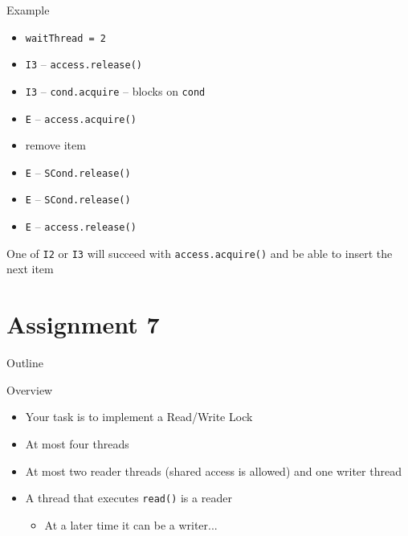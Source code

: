 \begin{frame}{Example}
  \begin{itemize}
  \item \lstinline!waitThread = 2!
  \item \lstinline!I3! -- \lstinline!access.release()!
  \item \lstinline!I3! -- \lstinline!cond.acquire! -- blocks on \lstinline!cond!
  \item \lstinline!E! -- \lstinline!access.acquire()!
  \item remove item
  \item \lstinline!E! -- \lstinline!SCond.release()!
  \item \lstinline!E! -- \lstinline!SCond.release()!
  \item \lstinline!E! -- \lstinline!access.release()!
  \end{itemize}


  One of \lstinline!I2! or \lstinline!I3! will succeed with
  \lstinline!access.acquire()! and be able to insert the next item
\end{frame}


\section{Assignment 7}

\begin{frame}{Outline}
  \tableofcontents[current]
\end{frame}

\begin{frame}{Overview}
  \begin{itemize}
  \item Your task is to implement a Read/Write Lock
  \item At most four threads
  \item At most two reader threads (shared access is allowed) and one
    writer thread
  \item A thread that executes \lstinline!read()! is a reader
    \begin{itemize}
    \item At a later time it can be a writer...
    \end{itemize}
  \end{itemize}
\end{frame}

